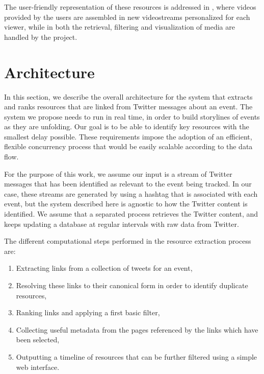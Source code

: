 \documentclass{sig-alternate}
\begin{document}
The user-friendly representation of these resources is addressed in \cite{cesar:HT11}, where videos provided by the users are assembled in new videostreams personalized for each viewer, while in \cite{Rizzo:SAM12} both the retrieval, filtering and visualization of media are handled by the project.


\section{Architecture}
\label{sec:architecture}
In this section, we describe the overall architecture for the system that extracts and ranks resources that are linked from Twitter messages about an event. The system we propose needs to run in real time, in order to build storylines of events as they are unfolding. Our goal is to be able to identify key resources with the smallest delay possible. These requirements impose the adoption of an efficient, flexible concurrency process that would be easily scalable according to the data flow.

For the purpose of this work, we assume our input is a stream of Twitter messages that has been identified as relevant to the event being tracked. In our case, these streams are generated by using a hashtag that is associated with each event, but the system described here is agnostic to how the Twitter content is identified. We assume that a separated process retrieves the Twitter content, and keeps updating a database at regular intervals with raw data from Twitter.

The different computational steps performed in the resource extraction process are:
\begin{enumerate}
 \item Extracting links from a collection of tweets for an event,
 \item Resolving these links to their canonical form in order to identify duplicate resources,
 \item Ranking links and applying a first basic filter,
 \item Collecting useful metadata from the pages referenced by the links which have been selected,
 \item Outputting a timeline of resources that can be further filtered using a simple web interface.
\end{enumerate}
\end{document}
